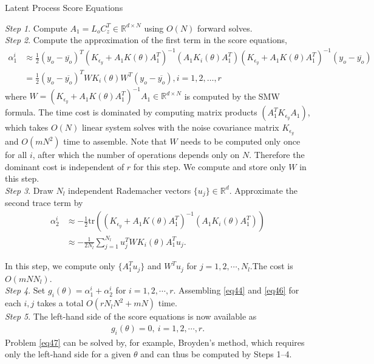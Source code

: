\documentclass[article,ij4uq]{ij4uq}              %
\begin{document}
\begin{algorithm}[t!]
\caption{Latent Process Score Equations}\label{alg:4}
\textit{Step 1}. Compute $A_{1}=L_{o}C_{z}^{T}\in\mathbb{R}^{d\times N}$ using $O(N)$ forward solves.\\
\textit{Step 2}. Compute the approximation of the first term in the score equations,
\begin{align}
    \alpha_{1}^{i}&\approx\frac{1}{2}(y_{o}-\overline{y_{o}})^{T}(K_{\epsilon_{y}}+A_{1}K(\theta)A_{1}^{T})^{-1}(A_{1}K_{i}(\theta)A_{1}^{T})(K_{\epsilon_{y}}+A_{1}K(\theta)A_{1}^{T})^{-1}(y_{o}-\overline{y_{o}})\\
    &=\frac{1}{2}(y_{o}-\overline{y_{o}})^{T}WK_{i}(\theta)W^{T}(y_{o}-\overline{y_{o}}), i=1,2,\ldots, r \label{eq44}
\end{align}
where $W=(K_{\epsilon_{y}}+A_{1}K(\theta)A_{1}^{T})^{-1}A_{1} \in \mathbb{R}^{d\times N}$ is computed by the SMW formula. The time cost is dominated by computing matrix products $(A_{1}^{T}K_{\epsilon_{y}}A_{1})$, which takes $O(N)$ linear system solves with the noise covariance matrix $K_{\epsilon_{y}}$  and $O(mN^{2})$ time to assemble. Note that $W$ needs to be computed only once for all $i$, after which the number of operations depends only on $N$. Therefore the dominant cost is independent of $r$ for this step. We  compute and store only $W$ in this step.\\
\textit{Step 3}. Draw $N_{l}$ independent Rademacher vectors $\{u_{j}\} \in \mathbb{R}^d $. Approximate the second trace term by
\begin{align}
    \alpha_{2}^{i}&\approx-\frac{1}{2}\mathrm{tr}((K_{\epsilon_{y}}+A_{1}K(\theta)A_{1}^{T})^{-1}(A_{1}K_{i}(\theta)A_{1}^{T}))\label{eq45}\\
    &\approx -\frac{1}{2N_{l}}\sum_{j=1}^{N_{l}}u_{j}^{T}WK_{i}(\theta)A_{1}^{T}u_{j}.\label{eq46}
\end{align}
\par In this step, we  compute only $\{A_{1}^{T}u_{j}\}$ and $W^{T}u_{j}$ for $j=1,2,\cdots,N_{l}$.The cost is $O(mNN_{l})$. \\
\textit{Step 4}. Set $g_{i}(\theta)=\alpha_{1}^{i}+\alpha_{2}^{i}$ for $i=1,2,\cdots,r$. Assembling \eqref{eq44} and \eqref{eq46} for each $i,j$ takes a total $O(rN_{l}N^{2}+mN)$ time.\\
\textit{Step 5}. The left-hand side of the score equations is now available as 
\begin{align}
    g_{i}(\theta)=0,\ i=1,2,\cdots,r.\label{eq47}
\end{align}
Problem \eqref{eq47} can be solved by, for example, Broyden's method, which  requires only the left-hand side for a given $\theta$ and can thus be computed by Steps 1--4.
\end{algorithm}
\end{document}
